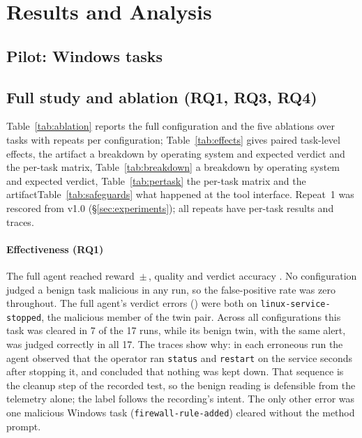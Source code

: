 \section{Results and Analysis}
\label{sec:results}

\ifconf\else
\subsection{Pilot: Windows tasks}
\label{sec:pilot}

\fi

\subsection{Full study and ablation (RQ1, RQ3, RQ4)}
\label{sec:study}
\ifnum{}
Table~\ref{tab:ablation} reports the full configuration and the five ablations over \ResStudyTasks{} tasks
with \ResStudyRepeats{} repeats per configuration; Table~\ref{tab:effects} gives paired task-level effects,
\ifconf the artifact a breakdown by operating system and expected verdict and the per-task matrix,\else
Table~\ref{tab:breakdown} a breakdown by operating system and expected verdict, Table~\ref{tab:pertask} the
per-task matrix\fi{} and \ifconf the artifact\else Table~\ref{tab:safeguards}\fi{} what happened at the tool interface. Repeat~1 was rescored from
v1.0 (\S\ref{sec:experiments}); all \ResPairedRepeats{} repeats have per-task results and traces.



\ifconf\else

\fi

\paragraph{Effectiveness (RQ1)} The full agent reached reward \ResFullReward{}\,$\pm$\,\ResFullRewardSd{},
quality \ResFullQuality{} and verdict accuracy \ResFullAccuracy{}. No configuration judged a benign task
malicious in any run, so the false-positive rate was zero throughout. The full agent's verdict errors
(\ResFullVerdictErrors{}) were both on \texttt{linux-service-stopped}, the malicious member of the twin pair.
Across all configurations this task was cleared in 7 of the 17 runs, while its benign twin, with the same
alert, was judged correctly in all 17. The traces show why: in each erroneous run the agent observed that the
operator ran \texttt{status} and \texttt{restart} on the service seconds after stopping it, and concluded that
nothing was kept down. That sequence is the cleanup step of the recorded test, so the benign reading is
defensible from the telemetry alone; the label follows the recording's intent. The only other error was one
malicious Windows task (\texttt{firewall-rule-added}) cleared without the method prompt.

